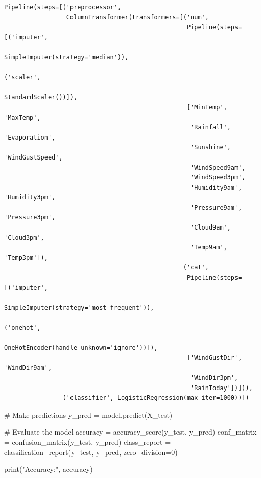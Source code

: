 \documentclass[
  letterpaper,
  DIV=11,
  numbers=noendperiod]{scrartcl}
\newenvironment{Shaded}{\begin{snugshade}}{\end{snugshade}}
\newcommand{\BuiltInTok}[1]{\textcolor[rgb]{0.00,0.23,0.31}{#1}}
\newcommand{\CommentTok}[1]{\textcolor[rgb]{0.37,0.37,0.37}{#1}}
\newcommand{\DecValTok}[1]{\textcolor[rgb]{0.68,0.00,0.00}{#1}}
\newcommand{\NormalTok}[1]{\textcolor[rgb]{0.00,0.23,0.31}{#1}}
\newcommand{\OperatorTok}[1]{\textcolor[rgb]{0.37,0.37,0.37}{#1}}
\newcommand{\StringTok}[1]{\textcolor[rgb]{0.13,0.47,0.30}{#1}}
\begin{document}
\begin{verbatim}
Pipeline(steps=[('preprocessor',
                 ColumnTransformer(transformers=[('num',
                                                  Pipeline(steps=[('imputer',
                                                                   SimpleImputer(strategy='median')),
                                                                  ('scaler',
                                                                   StandardScaler())]),
                                                  ['MinTemp', 'MaxTemp',
                                                   'Rainfall', 'Evaporation',
                                                   'Sunshine', 'WindGustSpeed',
                                                   'WindSpeed9am',
                                                   'WindSpeed3pm',
                                                   'Humidity9am', 'Humidity3pm',
                                                   'Pressure9am', 'Pressure3pm',
                                                   'Cloud9am', 'Cloud3pm',
                                                   'Temp9am', 'Temp3pm']),
                                                 ('cat',
                                                  Pipeline(steps=[('imputer',
                                                                   SimpleImputer(strategy='most_frequent')),
                                                                  ('onehot',
                                                                   OneHotEncoder(handle_unknown='ignore'))]),
                                                  ['WindGustDir', 'WindDir9am',
                                                   'WindDir3pm',
                                                   'RainToday'])])),
                ('classifier', LogisticRegression(max_iter=1000))])
\end{verbatim}

\begin{Shaded}
\begin{Highlighting}[]
\CommentTok{\# Make predictions}
\NormalTok{y\_pred }\OperatorTok{=}\NormalTok{ model.predict(X\_test)}

\CommentTok{\# Evaluate the model}
\NormalTok{accuracy }\OperatorTok{=}\NormalTok{ accuracy\_score(y\_test, y\_pred)}
\NormalTok{conf\_matrix }\OperatorTok{=}\NormalTok{ confusion\_matrix(y\_test, y\_pred)}
\NormalTok{class\_report }\OperatorTok{=}\NormalTok{ classification\_report(y\_test, y\_pred, zero\_division}\OperatorTok{=}\DecValTok{0}\NormalTok{)}

\BuiltInTok{print}\NormalTok{(}\StringTok{"Accuracy:"}\NormalTok{, accuracy)}
\end{Highlighting}
\end{Shaded}
\end{document}
